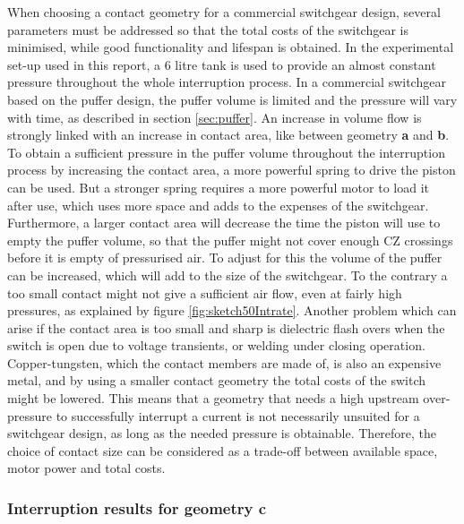 \documentclass[10pt,b5paper,twoside]{article}
\begin{document}
When choosing a contact geometry for a commercial switchgear design, several parameters must be addressed so that the total costs of the switchgear is minimised, while good functionality and lifespan is obtained. In the experimental set-up used in this report, a 6 litre tank is used to provide an almost constant pressure throughout the whole interruption process. In a commercial switchgear based on the puffer design, the puffer volume is limited and the pressure will vary with time, as described in section \ref{sec:puffer}. An increase in volume flow is strongly linked with an increase in contact area, like between geometry \textbf{a} and \textbf{b}. To obtain a sufficient pressure in the puffer volume throughout the interruption process by increasing the contact area, a more powerful spring to drive the piston can be used. But a stronger spring requires a more powerful motor to load it after use, which uses more space and adds to the expenses of the switchgear. Furthermore, a larger contact area will decrease the time the piston will use to empty the puffer volume, so that the puffer might not cover enough CZ crossings before it is empty of pressurised air. To adjust for this the volume of the puffer can be increased, which will add to the size of the switchgear. To the contrary a too small contact might not give a sufficient air flow, even at fairly high pressures, as explained by figure \ref{fig:sketch50Intrate}. Another problem which can arise if the contact area is too small and sharp is dielectric flash overs when the switch is open due to voltage transients, or welding under closing operation. Copper-tungsten, which the contact members are made of, is also an expensive metal, and by using a smaller contact geometry the total costs of the switch might be lowered. This means that a geometry that needs a high upstream over-pressure to successfully interrupt a current is not necessarily unsuited for a switchgear design, as long as the needed pressure is obtainable. Therefore, the choice of contact size can be considered as a trade-off between available space, motor power and total costs.

\subsubsection{Interruption results for geometry \textbf{c}} \label{sec:intTestGeoC}
\end{document}
